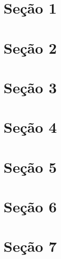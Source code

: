 \section{Seção 1}
\lipsum[1]

\section{Seção 2}
\lipsum[2]

\section{Seção 3}
\lipsum[3]

\section{Seção 4}
\lipsum[4]

\section{Seção 5}
\lipsum[5]

\section{Seção 6}
\lipsum[6]

\section{Seção 7}
\lipsum[7]

